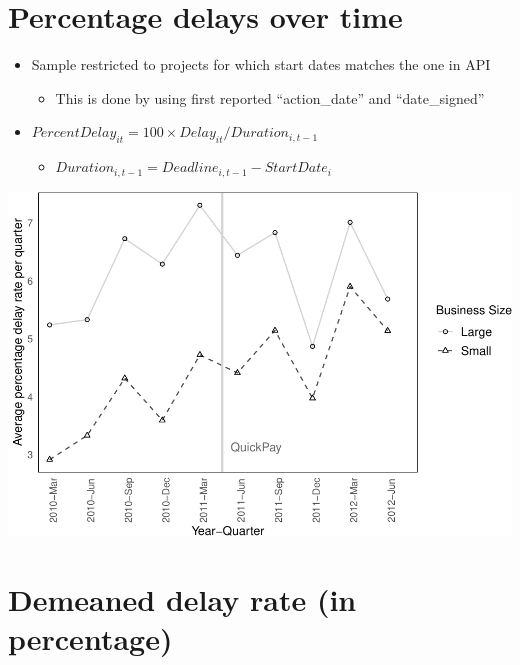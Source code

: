 \documentclass[
]{article}
\providecommand{\tightlist}{%
  \setlength{\itemsep}{0pt}\setlength{\parskip}{0pt}}
\begin{document}
\hypertarget{percentage-delays-over-time}{%
\section{Percentage delays over
time}\label{percentage-delays-over-time}}

\begin{itemize}
\tightlist
\item
  Sample restricted to projects for which start dates matches the one in
  API

  \begin{itemize}
  \tightlist
  \item
    This is done by using first reported ``action\_date'' and
    ``date\_signed''
  \end{itemize}
\item
  \(PercentDelay_{it}=100 \times Delay_{it}/Duration_{i,t-1}\)

  \begin{itemize}
  \tightlist
  \item
    \(Duration_{i,t-1} = Deadline_{i,t-1} - StartDate_i\)
  \end{itemize}
\end{itemize}

\includegraphics{qp_first_pc_delay-2_files/figure-latex/plot_pc_delay-1.pdf}

\hypertarget{demeaned-delay-rate-in-percentage}{%
\section{Demeaned delay rate (in
percentage)}\label{demeaned-delay-rate-in-percentage}}
\end{document}
